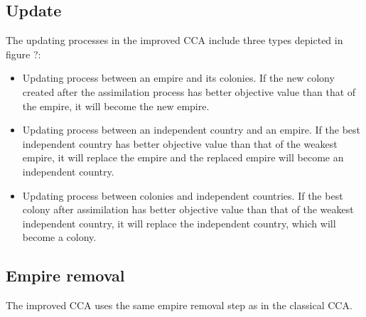 \subsection{Update}
The updating processes in the improved CCA include three types depicted in figure ?:
\begin{itemize}
	\item Updating process between an empire and its colonies. If the new colony created after the assimilation process has better objective value than that of the empire, it will become the new empire.
	\item Updating process between an independent country and an empire. If the best independent country has better objective value than that of the weakest empire, it will replace the empire and the replaced empire will become an independent country.
	\item Updating process between colonies and independent countries. If the best colony after assimilation has better objective value than that of the weakest independent country, it will replace the independent country, which will become a colony.
\end{itemize}

\subsection{Empire removal}
The improved CCA uses the same empire removal step as in the classical CCA.